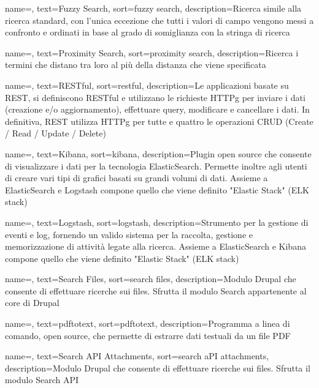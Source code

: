 {
	name=,
	text=Fuzzy Search,
	sort=fuzzy search,
	description={Ricerca simile alla ricerca standard, con l'unica eccezione che tutti i valori di campo vengono messi a confronto e ordinati in base al grado di somiglianza con la stringa di ricerca}
}

{
	name=,
	text=Proximity Search,
	sort=proximity search,
	description={Ricerca i termini che distano tra loro al più della distanza che viene specificata}
}

{
	name=,
	text=RESTful,
	sort=restful,
	description={Le applicazioni basate su \gls{REST}, si definiscono RESTful e utilizzano le richieste \gls{HTTPg} per inviare i dati (creazione e/o aggiornamento), effettuare query, modificare e cancellare i dati. In definitiva, \gls{REST} utilizza \gls{HTTPg} per tutte e quattro le operazioni CRUD (Create / Read / Update / Delete)}
}

{
	name=,
	text=Kibana,
	sort=kibana,
	description={Plugin \gls{open source} che consente di visualizzare i dati per la tecnologia \gls{ElasticSearch}. Permette inoltre agli utenti di creare vari tipi di grafici basati su grandi volumi di dati. Assieme a \gls{ElasticSearch} e \gls{Logstash} compone quello che viene definito "Elastic Stack" (ELK stack)}
}

{
	name=,
	text=Logstash,
	sort=logstash,
	description={Strumento per la gestione di eventi e log, fornendo un valido sistema per la raccolta, gestione e memorizzazione di attività legate alla ricerca. Assieme a \gls{ElasticSearch} e \gls{Kibana} compone quello che viene definito "Elastic Stack" (ELK stack)}
}

{
	name=,
	text=Search Files,
	sort=search files,
	description={\gls{Modulo} \gls{Drupal} che consente di effettuare ricerche sui files. Sfrutta il modulo Search appartenente al core di \gls{Drupal}}
}

{
	name=,
	text=pdftotext,
	sort=pdftotext,
	description={Programma a linea di comando, 	\gls{open source}, che permette di estrarre dati testuali da un file PDF}
}

{
	name=,
	text=Search API Attachments,
	sort=search aPI attachments,
	description={\gls{Modulo} \gls{Drupal} che consente di effettuare ricerche sui files. Sfrutta il modulo \gls{Search API}}
}

